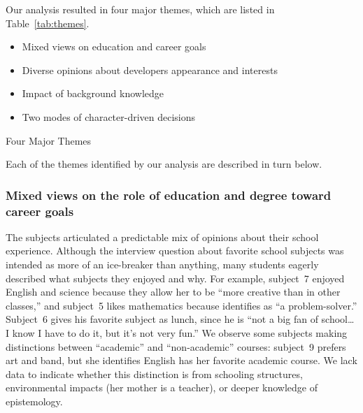 \documentclass[letterpaper]{article}
\begin{document}
Our analysis resulted in four major themes, which are listed
in Table~\ref{tab:themes}.
%
\begin{table}
\begin{framed}
\begin{itemize}
\item Mixed views on education and career goals
\item Diverse opinions about developers appearance and interests
\item Impact of background knowledge
\item Two modes of character-driven decisions
\end{itemize}
\caption{Four Major Themes}
\label{tab:themes}
\end{framed}
\end{table}
%
Each of the themes identified by our analysis are described in turn below.


\newcommand{\theme}[1]{\subsubsection*{#1}}

\theme{Mixed views on the role of education and degree toward career goals}

The subjects articulated a predictable mix of opinions about their
school experience. Although the interview question about favorite
school subjects was intended as more of an ice-breaker than anything,
many students eagerly described what subjects they enjoyed and why.
For example, subject~7 enjoyed English and science because they allow her
to be ``more creative than in other classes,'' and subject~5 likes
mathematics because identifies as ``a problem-solver.''
Subject~6 gives his favorite subject as lunch, since he is ``not a big
fan of school\ldots{} I know I have to do it, but it's not very fun.''
We observe some subjects making distinctions between ``academic'' and 
``non-academic'' courses: subject~9 prefers art and band, but she identifies
English has her favorite academic course. We lack data to indicate whether
this distinction is from schooling structures, environmental impacts (her
mother is a teacher), or deeper knowledge of epistemology.
\end{document}
